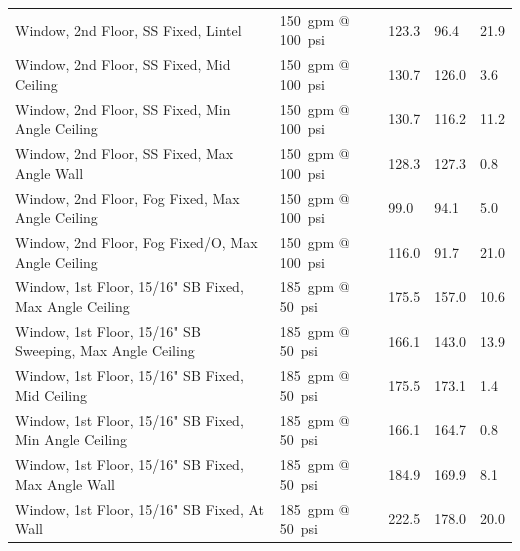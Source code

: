 \documentclass[12pt,oneside]{book}
\begin{document}
\begin{table}[!ht]
\begin{tabular}{lllll}
Window, 2nd Floor, SS Fixed, Lintel                      & 150~gpm @ 100~psi              & 123.3                             & 96.4                               & 21.9                   \\
Window, 2nd Floor, SS Fixed, Mid Ceiling                 & 150~gpm @ 100~psi              & 130.7                             & 126.0                              & 3.6                    \\
Window, 2nd Floor, SS Fixed, Min Angle Ceiling           & 150~gpm @ 100~psi              & 130.7                             & 116.2                              & 11.2                   \\
Window, 2nd Floor, SS Fixed, Max Angle Wall              & 150~gpm @ 100~psi              & 128.3                             & 127.3                              & 0.8                    \\
Window, 2nd Floor, Fog Fixed, Max Angle Ceiling          & 150~gpm @ 100~psi              &  99.0                             & 94.1                               & 5.0                    \\
Window, 2nd Floor, Fog Fixed/O, Max Angle Ceiling        & 150~gpm @ 100~psi              & 116.0                             & 91.7                               & 21.0                   \\
Window, 1st Floor, 15/16" SB Fixed, Max Angle Ceiling    & 185~gpm @ 50~psi               & 175.5                             & 157.0                              & 10.6                   \\
Window, 1st Floor, 15/16" SB Sweeping, Max Angle Ceiling & 185~gpm @ 50~psi               & 166.1                             & 143.0                              & 13.9                   \\
Window, 1st Floor, 15/16" SB Fixed, Mid Ceiling          & 185~gpm @ 50~psi               & 175.5                             & 173.1                              & 1.4                    \\
Window, 1st Floor, 15/16" SB Fixed, Min Angle Ceiling    & 185~gpm @ 50~psi               & 166.1                             & 164.7                              & 0.8                    \\
Window, 1st Floor, 15/16" SB Fixed, Max Angle Wall       & 185~gpm @ 50~psi               & 184.9                             & 169.9                              & 8.1                    \\
Window, 1st Floor, 15/16" SB Fixed, At Wall              & 185~gpm @ 50~psi               & 222.5                             & 178.0                              & 20.0                   \\

\end{tabular}
\end{table}
\end{document}

